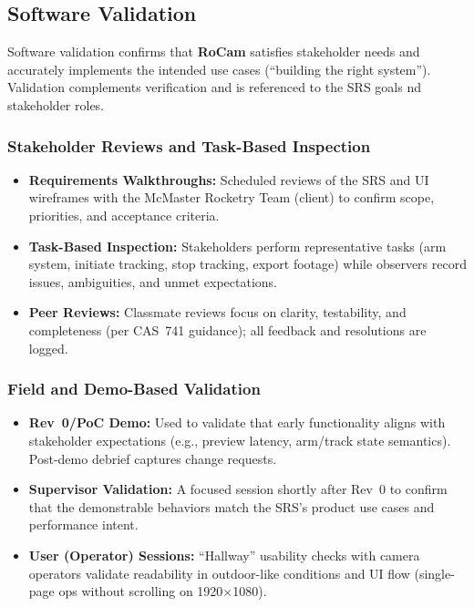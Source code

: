 \documentclass[12pt, titlepage]{article}
\begin{document}
\subsection{Software Validation}

Software validation confirms that \textbf{RoCam} satisfies stakeholder needs
 and accurately implements the intended use cases (``building the right system''). 
 Validation complements verification and is referenced to the SRS goals 
 nd stakeholder roles.

\subsubsection*{Stakeholder Reviews and Task-Based Inspection}
\begin{itemize}
  \item \textbf{Requirements Walkthroughs:} Scheduled reviews of the SRS 
  and UI wireframes with the McMaster Rocketry Team (client) to confirm
  scope, priorities, and acceptance criteria.
  \item \textbf{Task-Based Inspection:} Stakeholders perform 
  representative tasks (arm system, initiate tracking, stop tracking, export 
  footage) while observers record issues, ambiguities, and unmet expectations.
  \item \textbf{Peer Reviews:} Classmate reviews focus on clarity, 
  testability, and completeness (per CAS~741 guidance); all feedback and
   resolutions are logged.
\end{itemize}

\subsubsection*{Field and Demo-Based Validation}
\begin{itemize}
  \item \textbf{Rev~0/PoC Demo:} Used to validate that early 
  functionality aligns with stakeholder expectations (e.g., preview 
  latency, arm/track state semantics). Post-demo debrief captures change 
  requests.
  \item \textbf{Supervisor Validation:} A focused session shortly 
  after Rev~0 to confirm that the demonstrable behaviors match the 
  SRS’s product use cases and performance intent.
  \item \textbf{User (Operator) Sessions:} ``Hallway'' usability 
  checks with camera operators validate readability in outdoor-like 
  conditions and UI flow (single-page ops without scrolling on 1920$\times$1080).
\end{itemize}
\end{document}
